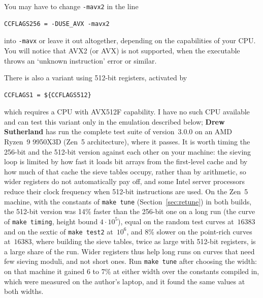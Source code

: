 \documentclass[12pt,a4paper,oneside]{amsart}
\begin{document}

You may have to change \verb+-mavx2+ in the line
\begin{verbatim}
CCFLAGS256 = -DUSE_AVX -mavx2
\end{verbatim}
into \verb+-mavx+ or leave it out altogether, depending on the capabilities
of your CPU. You will notice that AVX2 (or AVX) is not supported, when the
executable throws an `unknown instruction' error or similar.

There is also a variant using 512-bit registers, activated by
\begin{verbatim}
CCFLAGS1 = ${CCFLAGS512}
\end{verbatim}
which requires a CPU with AVX512F capability. I have no such CPU available
and can test this variant only in the emulation described below;
\textbf{Drew Sutherland} has run the complete test suite of version~3.0.0 on
an AMD Ryzen~9 9950X3D (Zen~5 architecture), where it passes. It is worth
timing the 256-bit and the 512-bit version against each other on your
machine: the sieving loop is limited by how fast it loads bit arrays from the
first-level cache and by how much of that cache the sieve tables occupy,
rather than by arithmetic, so wider registers do not automatically pay off,
and some Intel server processors reduce their clock frequency when 512-bit
instructions are used. On the Zen~5 machine, with the constants of
\texttt{make tune} (Section~\ref{sec:retune}) in both builds, the 512-bit
version was 14\% faster than the 256-bit one on a long run (the curve of
\texttt{make timing}, height bound $4\cdot10^5$), equal on the random test
curves at~$16383$ and on the sextic of \texttt{make test2} at~$10^6$, and
8\% slower on the point-rich curves at~$16383$, where building the sieve
tables, twice as large with 512-bit registers, is a large share of the run.
Wider registers thus help long runs on curves that need few sieving moduli,
and not short ones. Run \texttt{make tune} after choosing the width: on that
machine it gained 6 to 7\% at either width over the constants compiled in,
which were measured on the author's laptop, and it found the same values at
both widths.
\end{document}
